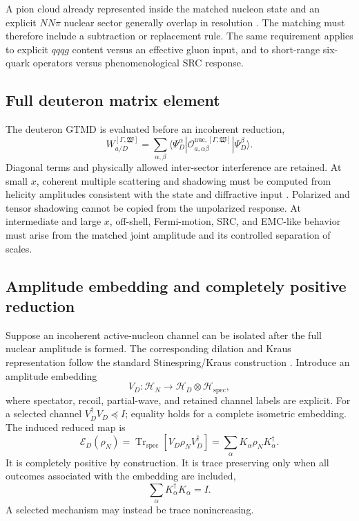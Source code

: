 \documentclass[11pt]{article}
\newcommand{\Tr}{\operatorname{Tr}}
\newcommand{\Hil}{\mathcal H}
\newcommand{\cO}{\mathcal O}
\newcommand{\cE}{\mathcal E}
\begin{document}
A pion cloud already represented inside the matched nucleon state and an
explicit \(NN\pi\) nuclear sector generally overlap in resolution \cite{Miller2014}.  The matching must
therefore include a subtraction or replacement rule.  The same requirement
applies to explicit \(qqqg\) content versus an effective gluon input, and to
short-range six-quark operators versus phenomenological SRC response.

\subsection{Full deuteron matrix element}

The deuteron GTMD is evaluated before an incoherent reduction,
\begin{equation}
 W_{a/D}^{[\Gamma,\mathfrak W]}
 =\sum_{\alpha,\beta}
 \langle\Psi_D^\alpha|
 \cO_{a,\alpha\beta}^{\mathrm{nuc},[\Gamma,\mathfrak W]}
 |\Psi_D^\beta\rangle.
\label{eq:full-deuteron-matrix-element}
\end{equation}
Diagonal terms and physically allowed inter-sector interference are retained.
At small \(x\), coherent multiple scattering and shadowing must be computed
from helicity amplitudes consistent with the state and diffractive input
\cite{Frankfurt2012}.
Polarized and tensor shadowing cannot be copied from the unpolarized response.
At intermediate and large \(x\), off-shell, Fermi-motion, SRC, and EMC-like
behavior must arise from the matched joint amplitude and its controlled
separation of scales.

\subsection{Amplitude embedding and completely positive reduction}

Suppose an incoherent active-nucleon channel can be isolated after the full
nuclear amplitude is formed.  The corresponding dilation and Kraus representation follow the standard Stinespring/Kraus construction \cite{Stinespring1955,Kraus1983}.  Introduce an amplitude embedding
\begin{equation}
 V_D:\Hil_N\longrightarrow
 \Hil_D\otimes\Hil_{\mathrm{spec}},
\label{eq:stinespring-embedding}
\end{equation}
where spectator, recoil, partial-wave, and retained channel labels are
explicit.  For a selected channel \(V_D^\dagger V_D\preceq I\); equality holds for a complete isometric embedding.  The induced reduced map is
\begin{equation}
 \cE_D(\rho_N)
 =\Tr_{\mathrm{spec}}
 \left[V_D\rho_NV_D^\dagger\right]
 =\sum_\alpha K_\alpha\rho_NK_\alpha^\dagger.
\label{eq:kraus-from-amplitude}
\end{equation}
It is completely positive by construction.  It is trace preserving only when
all outcomes associated with the embedding are included,
\begin{equation}
 \sum_\alpha K_\alpha^\dagger K_\alpha=I.
\label{eq:kraus-completeness}
\end{equation}
A selected mechanism may instead be trace nonincreasing.
\end{document}
